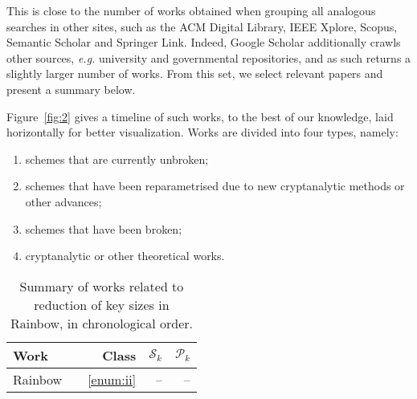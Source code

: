 \documentclass[openright]{report}
\begin{document}
This is close to the number of works obtained when grouping all analogous searches in other sites, such as the ACM Digital Library, IEEE Xplore, Scopus, Semantic Scholar and Springer Link. Indeed, Google Scholar additionally crawls other sources, \emph{e.g.} university and governmental repositories, and as such returns a slightly larger number of works. From this set, we select relevant papers and present a summary below.

Figure~\ref{fig:2} gives a timeline of such works, to the best of our knowledge, laid horizontally for better visualization. Works are divided into four types, namely:

\begin{enumerate}[label=(\roman*), itemsep=1pt]
  \item\label{enum:i} schemes that are currently unbroken;
  \item\label{enum:ii} schemes that have been reparametrised due to new cryptanalytic methods or other advances;
  \item\label{enum:iii} schemes that have been broken;
  \item\label{enum:iv} cryptanalytic or other theoretical works.
\end{enumerate}

\begin{table}[htbp]
  \renewcommand{\arraystretch}{1.2}
  \setlength{\tabcolsep}{8pt}
  \centering
  \begin{tabular}{l*{3}{r}}
    \toprule
    Work & Class & $\mathcal{S}_{k}$ & $\mathcal{P}_{k}$ \\ \midrule
    Rainbow~\cite{Ding:200506:inproc} & ~\ref{enum:ii} & -- & -- \\
    \bottomrule
  \end{tabular}
  \caption{Summary of works related to reduction of key sizes in Rainbow, in chronological order.}\label{tab:1}
\end{table}
\end{document}

